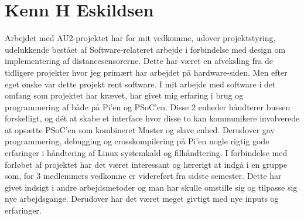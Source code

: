 \section{Kenn H Eskildsen}\label{sec:opnaaede_erfaringer_ke}

Arbejdet med AU2-projektet har for mit vedkomme, udover projektstyring, udelukkende bestået af Software-relateret arbejde i forbindelse med design om implementering af distancesensorerne. 
Dette har været en afveksling fra de tidligere projekter hvor jeg primært har arbejdet på hardware-siden. 
Men efter eget ønske var dette projekt rent software.
I mit arbejde med software i det omfang som projektet har krævet, har givet mig erfaring i brug og programmering af \IIC både på Pi'en og PSoC'en. 
Disse 2 enheder håndterer bussen forskelligt, og dét at skabe et interface hvor disse to kan kommunikere involverede at opsætte PSoC'en som kombineret Master og slave enhed. Derudover gav programmering, debugging og crosskompilering på Pi'en nogle rigtig gode erfaringer i håndtering af Linux systemkald og filhåndtering.
I forbindelse med forløbet af projektet har det været interessant og lærerigt at indgå i en gruppe som, for 3 medlemmers vedkomne er videreført fra sidste semester. 
Dette har givet indsigt i andre arbejdsmetoder og man har skulle omstille sig og tilpasse sig nye arbejdsgange. Derudover har det været meget givtigt med nye inputs og erfaringer. 